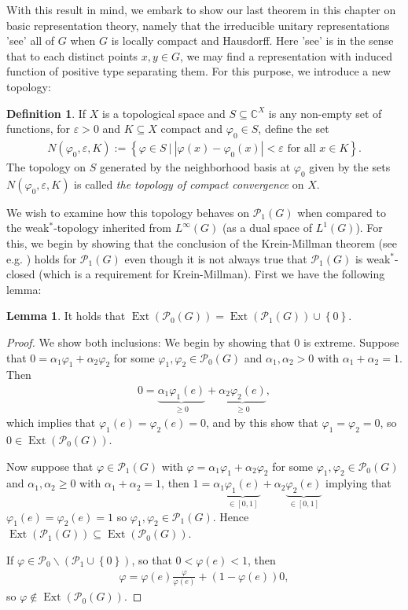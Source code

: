 \documentclass[10pt,twoside,openany,final]{memoir}
\theoremstyle{definition}
\newtheorem{lemma}[theorem]{Lemma}
\newtheorem{definition}[theorem]{Definition}
\theoremstyle{Break}
\newcommand{\C}{\mathbb{C}}
\renewcommand{\P}{\mathcal{P}}
\DeclareMathOperator{\Ext}{Ext}
\begin{document}
With this result in mind, we embark to show our last theorem in this chapter on basic representation theory, namely that the irreducible unitary representations 'see' all of $G$ when $G$ is locally compact and Hausdorff. Here 'see' is in the sense that to each distinct points $x,y \in G$, we may find a representation with induced function of positive type separating them. For this purpose, we introduce a new topology:
\begin{definition}
	If $X$ is a topological space and $S \subseteq \C^X$ is any non-empty set of functions, for $\varepsilon > 0$ and $K \subseteq X$ compact and $\varphi_0 \in S$, define the set	
	\begin{align*}
		N(\varphi_0,\varepsilon,K) := \left\{ \varphi \in S \ \big| \ |\varphi(x)-\varphi_0(x)| < \varepsilon \text{ for all } x \in K \right\}.
	\end{align*}
	The topology on $S$ generated by the neighborhood basis at $\varphi_0$ given by the sets $N(\varphi_0,\varepsilon,K)$ is called \emph{the topology of compact convergence} on $X$.
\end{definition}
We wish to examine how this topology behaves on $\mathcal{P}_1(G)$ when compared to the weak$^*$-topology inherited from $L^\infty(G)$ (as a dual space of $L^1(G)$). For this, we begin by showing that the conclusion of the Krein-Millman theorem (see e.g. \cite[75]{rudin1991functional}) holds for $\mathcal{P}_1(G)$ even though it is not always true that $\mathcal{P}_1(G)$ is weak$^*$-closed (which is a requirement for Krein-Millman). First we have the following lemma:
\begin{lemma}
	It holds that $\Ext(\mathcal{P}_0(G))=\Ext(\mathcal{P}_1(G))\cup\left\{ 0 \right\}$.
	\label{3.26}
\end{lemma}
\begin{proof}
	We show both inclusions: We begin by showing that $0$ is extreme. Suppose that $0=\alpha_1 \varphi_1+\alpha_2 \varphi_2$ for some $\varphi_1,\varphi_2 \in \mathcal{P}_0(G)$ and $\alpha_1,\alpha_2 > 0$ with $\alpha_1+\alpha_2=1$. Then
	\begin{align*}
		0=\underbrace{\alpha_1 \varphi_1(e)}_{\geq 0}+\underbrace{\alpha_2 \varphi_{2}(e)}_{\geq 0},
	\end{align*}
	which implies that $\varphi_1(e)=\varphi_2(e)=0$, and by  this show that $\varphi_1=\varphi_2=0$, so $0 \in \Ext(\P_0(G))$.

	Now suppose that $\varphi \in \P_1(G)$ with $\varphi = \alpha_1 \varphi_1+\alpha_2\varphi_2$ for some $\varphi_1,\varphi_2 \in \P_0(G)$ and $\alpha_1,\alpha_2 \geq 0$ with $\alpha_1+\alpha_2=1$, then $1=\alpha_1 \underbrace{\varphi_1(e)}_{\in [0,1]}+\alpha_2 \underbrace{\varphi_2(e)}_{\in [0,1]}$ implying that $\varphi_1(e)=\varphi_2(e)=1$ so $\varphi_1, \varphi_2 \in \P_1(G)$. Hence $\Ext(\P_1(G)) \subseteq \Ext(\P_0(G))$.
	
	If $\varphi \in \P_0\backslash(\P_1 \cup \left\{ 0 \right\})$, so that $0 <\varphi(e)<1$, then
	\begin{align*}
	\varphi=\varphi(e) \frac{\varphi}{\varphi(e)}+(1-\varphi(e))0, 	
	\end{align*}
	so $\varphi \not \in \Ext(\P_0(G))$.
\end{proof}
\end{document}
